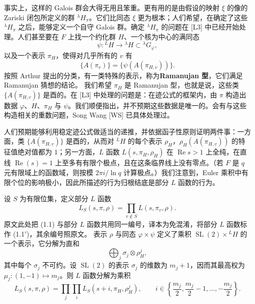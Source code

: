 事实上，这样的 Galois 群会大得无用且笨重。更有用的是由假设的映射 $\xi$ 的像的 Zariski 闭包所定义的群 ${}^{\lambda}H_\pi$。它们比同态 $\xi$ 更为根本；人们希望，在确定了这些 ${}^{\lambda}H_\pi$ 之后，能够定义一个自守 Galois 群。确定 ${}^{\lambda}H_\pi$ 的问题在 [L3] 中已经开始处理。人们甚至要在 $F$ 上找一个约化群 $H$、一个核为中心的满同态
\[
\psi:{}^LH\longrightarrow{}^{\lambda}H\subset{}^{\lambda}G_\varphi,
\]
以及一个表示 $\pi_H$，使得对几乎所有的 $v$ 有
\[
\{A(\pi_v)\}=\{\psi(A(\pi_{H,v}))\}.
\]
按照 Arthur 提出的分类，有一类特殊的表示，称为\textbf{Ramanujan 型}，它们满足 Ramanujan 猜想的结论。 我们希望 $\pi_H$ 是 Ramanujan 型，也就是说，这些类 $\{A(\pi_{H,v})\}$ 是酉的。在 [L3] 中处理的问题是：在迹公式的框架内，由 $\pi$ 构造出数据 $\varphi$、$H$、$\pi_H$ 与 $\psi$。我们顺便指出，并不预期这些数据是唯一的。会有与这些构造相关的重数问题，Song Wang [WS] 已具体处理过。

人们预期能够利用稳定迹公式做适当的递推，并依据函子性原则证明两件事：一方面，类 $\{A(\pi_{H,v})\}$ 是酉的，从而对 ${}^LH$ 的每个表示 $\rho_H$，$\rho_H(A(\pi_{H,v}))$ 的特征值绝对值都为 $1$；另一方面，$L$ 函数 $L(s,\pi_H,\rho_H)$ 在 $\operatorname{Re}s>1$ 上全纯，在直线 $\operatorname{Re}(s)=1$ 上至多有有限个极点，且在这条临界线上没有零点。（若 $F$ 是 $q$ 元有限域上的函数域，则按模 $2\pi i/\ln q$ 计算极点。）我们注意到，Euler 乘积中有限个位的影响极小，因此所描述的行为归根结底是部分 $L$ 函数的行为。

设 $S$ 为有限位集，定义部分 $L$ 函数
\begin{equation}\tag{1.1'}
L_S(s,\pi,\rho)=\prod_{v\notin S}L(s,\pi_v,\rho).
\end{equation}
原文此处把 (1.1) 与部分 $L$ 函数共用同一编号，译本为免混淆，将部分 $L$ 函数标作 (1.1$'$)，其余编号照原文。
表示 $\rho$ 与同态 $\varphi\times\psi$ 定义了乘积 $\operatorname{SL}(2)\times{}^LH$ 的一个表示，它分解为直和
\begin{equation}\tag{1.2}
\bigoplus_j\sigma_j\otimes\rho^j_H,
\end{equation}
其中每个 $\sigma_j$ 不可约。设 $\operatorname{SL}(2)$ 的表示 $\sigma_j$ 的维数为 $m_j+1$，因而其最高权为 $\mu_j:(1,-1)\mapsto m_j$。则 $L$ 函数分解为乘积
\begin{equation}\tag{1.3}
L_S(s,\pi,\rho)=\prod_j\prod_i L_S(s+i,\pi_H,\rho^j_H),
\qquad i\in\left\{\frac{m_j}{2},\frac{m_j}{2}-1,\dots,-\frac{m_j}{2}\right\}.
\end{equation}

